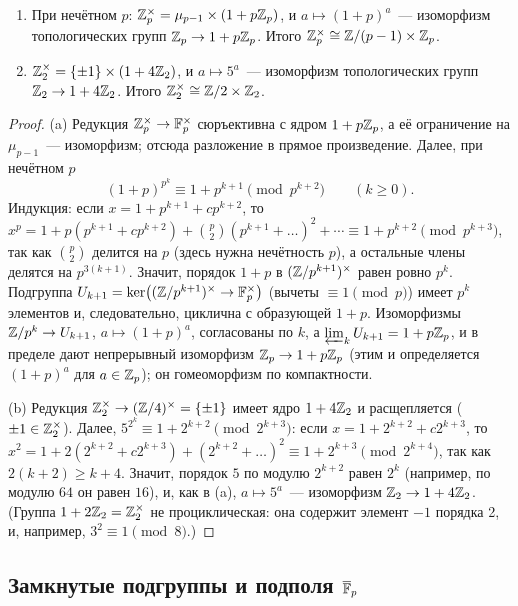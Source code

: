 \begin{proposition}
\begin{enumerate}[label=\textup{(\alph*)}]
\item При нечётном $p$: $\mathbb Z_p^\times=\mu_{p-1}\times(1+p\mathbb Z_p)$, и $a\mapsto(1+p)^a$~--- изоморфизм топологических групп
$\mathbb Z_p\to1+p\mathbb Z_p$. Итого $\mathbb Z_p^\times\cong\mathbb Z/(p-1)\times\mathbb Z_p$.
\item $\mathbb Z_2^\times=\{\pm1\}\times(1+4\mathbb Z_2)$, и $a\mapsto5^a$~--- изоморфизм топологических групп $\mathbb Z_2\to1+4\mathbb Z_2$. Итого
$\mathbb Z_2^\times\cong\mathbb Z/2\times\mathbb Z_2$.
\end{enumerate}
\end{proposition}

\begin{proof}
(a) Редукция $\mathbb Z_p^\times\to\mathbb F_p^\times$ сюръективна с ядром $1+p\mathbb Z_p$, а её ограничение на $\mu_{p-1}$~--- изоморфизм;
отсюда разложение в прямое произведение. Далее, при нечётном $p$
\[
(1+p)^{p^k}\equiv1+p^{k+1}\pmod{p^{k+2}}\qquad(k\ge0).
\]
Индукция: если $x=1+p^{k+1}+cp^{k+2}$, то $x^p=1+p(p^{k+1}+cp^{k+2})+\binom p2(p^{k+1}+\dots)^2+\cdots\equiv1+p^{k+2}
\pmod{p^{k+3}}$, так как $\binom p2$ делится на $p$ (здесь нужна нечётность $p$), а остальные члены делятся на
$p^{3(k+1)}$. Значит, порядок $1+p$ в $(\mathbb Z/p^{k+1})^\times$ равен ровно $p^k$. Подгруппа $U_{k+1}=\ker\bigl((\mathbb Z/p^{k+1})^\times\to\mathbb F_p^\times\bigr)$
(вычеты $\equiv1\pmod p$) имеет $p^k$ элементов и, следовательно, циклична с образующей $1+p$. Изоморфизмы
$\mathbb Z/p^k\to U_{k+1}$, $a\mapsto(1+p)^a$, согласованы по $k$, а $\varprojlim_kU_{k+1}=1+p\mathbb Z_p$, и в пределе дают непрерывный изоморфизм $\mathbb Z_p\to1+p\mathbb Z_p$ (этим и определяется
$(1+p)^a$ для $a\in\mathbb Z_p$); он гомеоморфизм по компактности.

(b) Редукция $\mathbb Z_2^\times\to(\mathbb Z/4)^\times=\{\pm1\}$ имеет ядро $1+4\mathbb Z_2$ и расщепляется ($\pm1\in\mathbb Z_2^\times$). Далее,
$5^{2^k}\equiv1+2^{k+2}\pmod{2^{k+3}}$: если $x=1+2^{k+2}+c2^{k+3}$, то $x^2=1+2(2^{k+2}+c2^{k+3})+(2^{k+2}+\dots)^2\equiv
1+2^{k+3}\pmod{2^{k+4}}$, так как $2(k+2)\ge k+4$. Значит, порядок $5$ по модулю $2^{k+2}$ равен $2^k$ (например, по
модулю $64$ он равен $16$), и, как в (a), $a\mapsto5^a$~--- изоморфизм $\mathbb Z_2\to1+4\mathbb Z_2$. (Группа $1+2\mathbb Z_2=\mathbb Z_2^\times$
не проциклическая: она содержит элемент $-1$ порядка 2, и, например, $3^2\equiv1\pmod8$.)
\end{proof}

\subsection*{Замкнутые подгруппы и подполя $\overline{\mathbb F}_p$}

